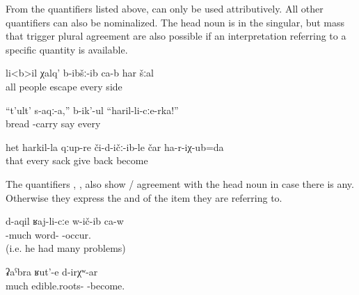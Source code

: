 From the quantifiers listed above,  can only be used attributively. All other quantifiers can also be nominalized. The head noun is in the singular, but mass  that trigger plural agreement are also possible if an interpretation referring to a specific quantity is available.

\begin{exe}
	\ex	\label{ex:All people escaped in every direction}
	\gll	li<b>il	χalq'	b-ibšː-ib ca-b	har	šːal\\
		all	people	escape 	every	side\\
	\glt	{}

	\ex	\label{ex:Bring bread from everyone}
	\gll	``t'ult'	s-aqː-a,''	b-ik'-ul		``haril-li-cːe-rka!''\\
		bread	-carry	say	every\\
	\glt	{}

	\ex	\label{ex:I (fem.) gave everyone's sack back and came back}
	\gll	het	harkil-la	qːup-re	či-d-ičː-ib-le						čar ha-r-iχ-ub=da\\
		that	every	sack	give	back become\\
	\glt	{}
\end{exe}

The quantifiers , ,   also show / agreement with the head noun in case there is any. Otherwise they express the  and  of the item they are referring to.

\begin{exe}
	\ex	\label{ex:He took part in many arguments}
	\gll	d-aqil	ʁaj-li-cːe	w-ič-ib ca-w\\
		-much	word-	-occur. \\
	\glt	{} (i.e. he had many problems)

	\ex	\label{ex:There are many edible roots}
	\gll	ʡaˁbra	ʁut'-e	d-irχʷ-ar\\
		much	edible.roots-	-become.\\
	\glt	{}
\end{exe}

